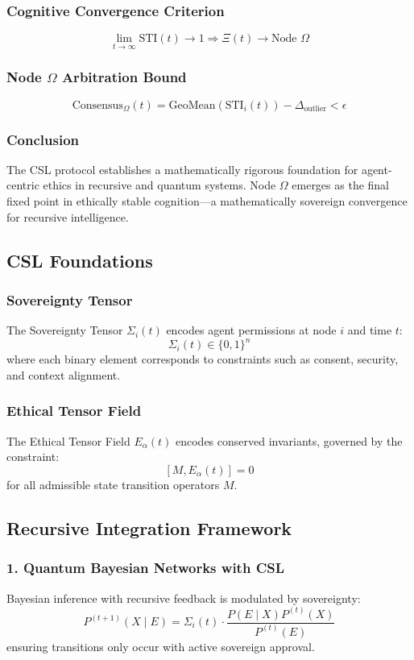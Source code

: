 \documentclass[12pt]{article}
\begin{document}
\subsubsection{Cognitive Convergence Criterion}
\[
\lim_{t \to \infty} \text{STI}(t) \rightarrow 1 \Rightarrow \Xi(t) \rightarrow \text{Node } \Omega
\]

\subsubsection{Node $\Omega$ Arbitration Bound}
\[
\text{Consensus}_\Omega(t) = \text{GeoMean}(\text{STI}_i(t)) - \Delta_{\text{outlier}} < \epsilon
\]

\subsubsection{Conclusion}
The CSL protocol establishes a mathematically rigorous foundation for agent-centric ethics in recursive and quantum systems. Node $\Omega$ emerges as the final fixed point in ethically stable cognition—a mathematically sovereign convergence for recursive intelligence.


\subsection{CSL Foundations}

\subsubsection*{Sovereignty Tensor}
The Sovereignty Tensor $\Sigma_i(t)$ encodes agent permissions at node $i$ and time $t$:
\[
\Sigma_i(t) \in \{0, 1\}^n
\]
where each binary element corresponds to constraints such as consent, security, and context alignment.

\subsubsection*{Ethical Tensor Field}
The Ethical Tensor Field $E_\alpha(t)$ encodes conserved invariants, governed by the constraint:
\[
[M, E_\alpha(t)] = 0
\]
for all admissible state transition operators $M$.

\subsection{Recursive Integration Framework}

\subsubsection*{1. Quantum Bayesian Networks with CSL}
Bayesian inference with recursive feedback is modulated by sovereignty:
\[
P^{(t+1)}(X \mid E) = \Sigma_i(t) \cdot \frac{P(E \mid X) P^{(t)}(X)}{P^{(t)}(E)}
\]
ensuring transitions only occur with active sovereign approval.
\end{document}
